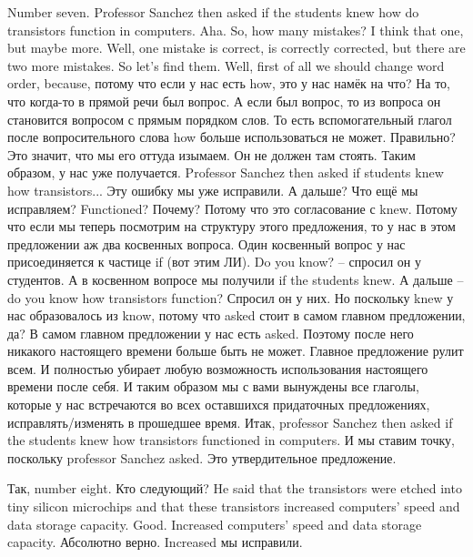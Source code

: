 \documentclass[main.tex]{subfiles}
\begin{document}
Number seven.
Professor Sanchez then asked if the students knew how do transistors function in computers.
Aha.
So, how many mistakes?
I think that one, but maybe more.
Well, one mistake is correct, is correctly corrected, but there are two more mistakes.
So let's find them.
Well, first of all we should change word order, because, потому что если у нас есть how, это у нас намёк на что?
На то, что когда-то в прямой речи был вопрос.
А если был вопрос, то из вопроса он становится вопросом с прямым порядком слов.
То есть вспомогательный глагол после вопросительного слова how больше использоваться не может.
Правильно?
Это значит, что мы его оттуда изымаем.
Он не должен там стоять.
Таким образом, у нас уже получается.
Professor Sanchez then asked if students knew how transistors...
Эту ошибку мы уже исправили.
А дальше?
Что ещё мы исправляем?
Functioned?
Почему?
Потому что это согласование с knew.
Потому что если мы теперь посмотрим на структуру этого предложения, то у нас в этом предложении аж два косвенных вопроса.
Один косвенный вопрос у нас присоединяется к частице if (вот этим ЛИ).
Do you know? – спросил он у студентов.
А в косвенном вопросе мы получили if the students knew.
А дальше -- do you know how transistors function?
Спросил он у них.
Но поскольку knew у нас образовалось из know, потому что asked стоит в самом главном предложении, да?
В самом главном предложении у нас есть asked.
Поэтому после него никакого настоящего времени больше быть не может.
Главное предложение рулит всем.
И полностью убирает любую возможность использования настоящего времени после себя.
И таким образом мы с вами вынуждены все глаголы, которые у нас встречаются во всех оставшихся придаточных предложениях, исправлять/изменять в прошедшее время.
Итак, professor Sanchez then asked if the students knew how transistors functioned in computers.
И мы ставим точку, поскольку professor Sanchez asked.
Это утвердительное предложение.

Так, number eight.
Кто следующий?
He said that the transistors were etched into tiny silicon microchips and that these transistors increased computers' speed and data storage capacity.
Good.
Increased computers' speed and data storage capacity.
Абсолютно верно.
Increased мы исправили.
\end{document}
